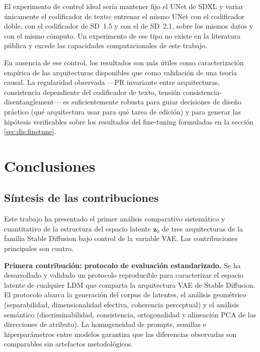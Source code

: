 \documentclass[12pt, a4paper, twoside]{book}
\newcommand{\z}{\mathbf{z}}
\begin{document}
El experimento de control ideal sería mantener fijo el UNet de SDXL y variar únicamente el codificador de texto: entrenar el mismo UNet con el codificador doble, con el codificador de SD~1.5 y con el de SD~2.1, sobre los mismos datos y con el mismo cómputo. Un experimento de ese tipo no existe en la literatura pública y excede las capacidades computacionales de este trabajo.

En ausencia de ese control, los resultados son más útiles como caracterización empírica de las arquitecturas disponibles que como validación de una teoría causal. La regularidad observada ---PR invariante entre arquitecturas, consistencia dependiente del codificador de texto, tensión consistencia-disentanglement--- es suficientemente robusta para guiar decisiones de diseño práctico (qué arquitectura usar para qué tarea de edición) y para generar las hipótesis verificables sobre los resultados del fine-tuning formuladas en la sección \ref{sec:dis:finetune}.

\chapter{Conclusiones}
\label{ch:conclusiones}

\section{Síntesis de las contribuciones}
\label{sec:concl:contribuciones}

Este trabajo ha presentado el primer análisis comparativo sistemático y cuantitativo de la estructura del espacio latente $\z_0$ de tres arquitecturas de la familia Stable Diffusion bajo control de la variable VAE. Las contribuciones principales son cuatro.

\textbf{Primera contribución: protocolo de evaluación estandarizado.} Se ha desarrollado y validado un protocolo reproducible para caracterizar el espacio latente de cualquier LDM que comparta la arquitectura VAE de Stable Diffusion. El protocolo abarca la generación del corpus de latentes, el análisis geométrico (separabilidad, dimensionalidad efectiva, coherencia perceptual) y el análisis semántico (discriminabilidad, consistencia, ortogonalidad y alineación PCA de las direcciones de atributo). La homogeneidad de prompts, semillas e hiperparámetros entre modelos garantiza que las diferencias observadas son comparables sin artefactos metodológicos.
\end{document}
